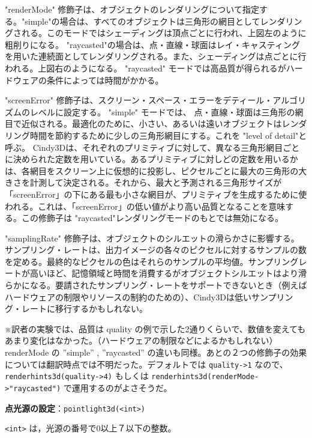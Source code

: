 \documentclass[papersize,a4paper,12pt,uplatex]{jsarticle}
\begin{document}
\vspace{\baselineskip}
"renderMode" 修飾子は、オブジェクトのレンダリングについて指定する。"simple"の場合は、すべてのオブジェクトは三角形の網目としてレンダリングされる。このモードではシェーディングは頂点ごとに行われ、上図左のように粗削りになる。 "raycasted"の場合は、点・直線・球面はレイ・キャスティングを用いた連続面としてレンダリングされる。また、シェーディングは点ごとに行われる。上図右のようになる。 "raycasted" モードでは高品質が得られるがハードウェアの条件によっては時間がかかる。

"screenError" 修飾子は、スクリーン・スペース・エラーをデティール・アルゴリズムのレベルに設定する。 "simple" モードでは、 点・直線・球面は三角形の網目で近似される。最適化のために、小さい、あるいは遠いオブジェクトはレンダリング時間を節約するために少しの三角形網目にする。これを "level of detail"と呼ぶ。 Cindy3Dは、それぞれのプリミティブに対して、異なる三角形網目ごとに決められた定数を用いている。あるプリミティブに対しどの定数を用いるかは、各網目をスクリーン上に仮想的に投影し、ピクセルごとに最大の三角形の大きさを計測して決定される。それから、最大と予測される三角形サイズが「screenError」の下にある最も小さな網目が、プリミティブを生成するために使われる。これは、「screenError」の低い値がより高い品質となることを意味する。この修飾子は "raycasted"レンダリングモードのもとでは無効になる。

 "samplingRate" 修飾子は、オブジェクトのシルエットの滑らかさに影響する。サンプリング・レートは、出力イメージの各々のピクセルに対するサンプルの数を定める。最終的なピクセルの色はそれらのサンプルの平均値。サンプリングレートが高いほど、記憶領域と時間を消費するがオブジェクトシルエットはより滑らかになる。要請されたサンプリング・レートをサポートできないとき（例えばハードウェアの制限やリソースの制約のための）、Cindy3Dは低いサンプリング・レートに移行するかもしれない。

\vspace{\baselineskip}
※訳者の実験では、品質は quality の例で示した2通りくらいで、数値を変えてもあまり変化はなかった。（ハードウェアの制限などによるかもしれない）renderMode の ”simple” , ”raycasted” の違いも同様。あとの２つの修飾子の効果については翻訳時点では不明だった。デフォルトでは \verb|quality->1| なので、 \verb|renderhints3d(quality->4)| もしくは \verb|renderhints3d(renderMode->"raycasted")| で運用するのがよさそうだ。

\hypertarget{pointlight3d}{} 
\vspace{\baselineskip}
\noindent
{\bf 点光源の設定}：\verb|pointlight3d(<int>)|

\verb|<int>| は，光源の番号で0以上７以下の整数。
\end{document}
